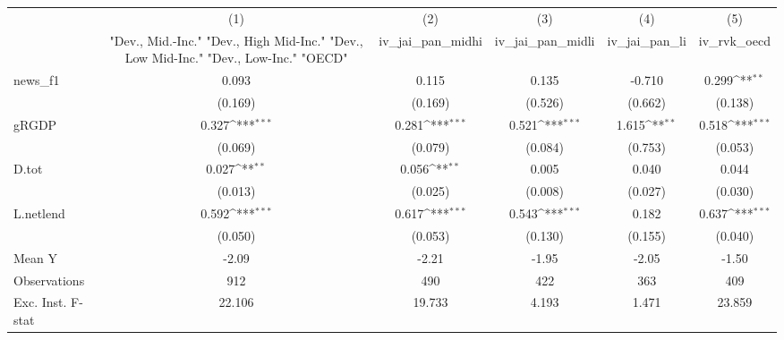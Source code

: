{
\def\sym#1{\ifmmode^{#1}\else\(^{#1}\)\fi}
\begin{tabular}{l*{5}{c}}
\toprule
            &\multicolumn{1}{c}{(1)}&\multicolumn{1}{c}{(2)}&\multicolumn{1}{c}{(3)}&\multicolumn{1}{c}{(4)}&\multicolumn{1}{c}{(5)}\\
            &\multicolumn{1}{c}{ "Dev., Mid.-Inc." "Dev., High Mid-Inc." "Dev., Low Mid-Inc." "Dev., Low-Inc." "OECD" }&\multicolumn{1}{c}{iv\_jai\_pan\_midhi}&\multicolumn{1}{c}{iv\_jai\_pan\_midli}&\multicolumn{1}{c}{iv\_jai\_pan\_li}&\multicolumn{1}{c}{iv\_rvk\_oecd}\\
\midrule
news\_f1     &       0.093         &       0.115         &       0.135         &      -0.710         &       0.299\sym{**} \\
            &     (0.169)         &     (0.169)         &     (0.526)         &     (0.662)         &     (0.138)         \\
\addlinespace
gRGDP       &       0.327\sym{***}&       0.281\sym{***}&       0.521\sym{***}&       1.615\sym{**} &       0.518\sym{***}\\
            &     (0.069)         &     (0.079)         &     (0.084)         &     (0.753)         &     (0.053)         \\
\addlinespace
D.tot       &       0.027\sym{**} &       0.056\sym{**} &       0.005         &       0.040         &       0.044         \\
            &     (0.013)         &     (0.025)         &     (0.008)         &     (0.027)         &     (0.030)         \\
\addlinespace
L.netlend   &       0.592\sym{***}&       0.617\sym{***}&       0.543\sym{***}&       0.182         &       0.637\sym{***}\\
            &     (0.050)         &     (0.053)         &     (0.130)         &     (0.155)         &     (0.040)         \\
\midrule
Mean Y      &       -2.09         &       -2.21         &       -1.95         &       -2.05         &       -1.50         \\
Observations&         912         &         490         &         422         &         363         &         409         \\
Exc. Inst. F-stat&      22.106         &      19.733         &       4.193         &       1.471         &      23.859         \\
\bottomrule
\end{tabular}
}
